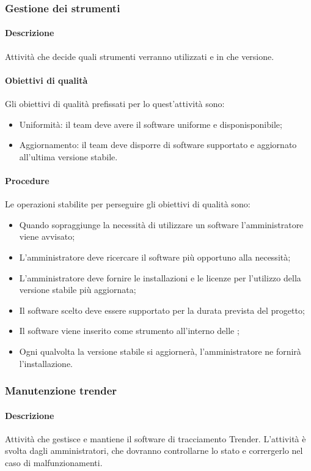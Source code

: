 \documentclass[../NormeDiProgetto_v4.0.0.tex]{subfiles}
\begin{document}
		\subsubsection{Gestione dei strumenti}
			\paragraph{Descrizione}
				Attività che decide quali strumenti verranno utilizzati e in che versione.
			\paragraph{Obiettivi di qualità}
				Gli obiettivi di qualità prefissati per lo quest'attività sono:
				\begin{itemize}
					\item Uniformità: il team deve avere il software uniforme e disponisponibile;
					\item Aggiornamento: il team deve disporre di software supportato e aggiornato all'ultima versione stabile.
				\end{itemize}
			\paragraph{Procedure}
				Le operazioni stabilite per perseguire gli obiettivi di qualità sono:
				\begin{itemize}
					\item Quando sopraggiunge la necessità di utilizzare un software l'amministratore viene avvisato;
					\item L'amministratore deve ricercare il software più opportuno alla necessità;
					\item L'amministratore deve fornire le installazioni e le licenze per l'utilizzo della versione stabile più aggiornata;
					\item Il software scelto deve essere supportato per la durata prevista del progetto;
					\item Il software viene inserito come strumento all'interno delle \normediprogetto;
					\item Ogni qualvolta la versione stabile si aggiornerà, l'amministratore ne fornirà l'installazione.
				\end{itemize}

		\subsubsection{Manutenzione trender}
			\paragraph{Descrizione}
				Attività che gestisce e mantiene il software di tracciamento Trender.
				L'attività è svolta dagli amministratori, che dovranno controllarne lo stato e corrergerlo nel caso di malfunzionamenti.			
\end{document}
